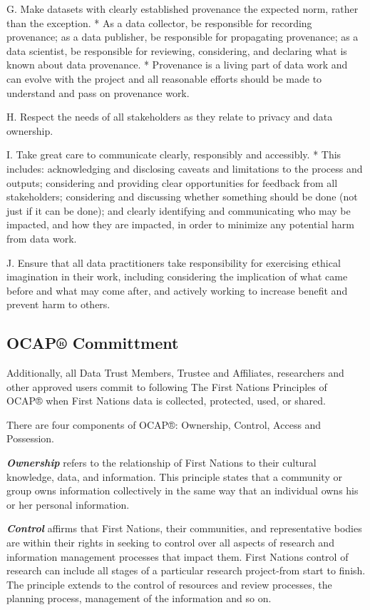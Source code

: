 \documentclass[]{book}
\begin{document}
G. Make datasets with clearly established provenance the expected norm, rather than the exception.
* As a data collector, be responsible for recording provenance; as a data publisher, be responsible for propagating provenance; as a data scientist, be responsible for reviewing, considering, and declaring what is known about data provenance.
* Provenance is a living part of data work and can evolve with the project and all reasonable efforts should be made to understand and pass on provenance work.

H. Respect the needs of all stakeholders as they relate to privacy and data ownership.

I. Take great care to communicate clearly, responsibly and accessibly.
* This includes: acknowledging and disclosing caveats and limitations to the process and outputs; considering and providing clear opportunities for feedback from all stakeholders; considering and discussing whether something should be done (not just if it can be done); and clearly identifying and communicating who may be impacted, and how they are impacted, in order to minimize any potential harm from data work.

J. Ensure that all data practitioners take responsibility for exercising ethical imagination in their work, including considering the implication of what came before and what may come after, and actively working to increase benefit and prevent harm to others.

\hypertarget{ocap-committment}{%
\subsection*{OCAP® Committment}\label{ocap-committment}}

Additionally, all Data Trust Members, Trustee and Affiliates, researchers and other approved users commit to following The First Nations Principles of OCAP® when First Nations data is collected, protected, used, or shared.

There are four components of OCAP®: Ownership, Control, Access and Possession.

\textbf{\emph{Ownership}} refers to the relationship of First Nations to their cultural knowledge, data, and information. This principle states that a community or group owns information collectively in the same way that an individual owns his or her personal information.

\textbf{\emph{Control}} affirms that First Nations, their communities, and representative bodies are within their rights in seeking to control over all aspects of research and information management processes that impact them. First Nations control of research can include all stages of a particular research project-from start to finish. The principle extends to the control of resources and review processes, the planning process, management of the information and so on.
\end{document}

